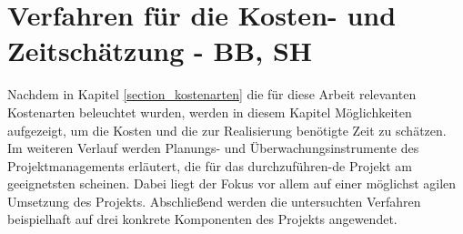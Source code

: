
\section{Verfahren für die Kosten- und Zeitschätzung - BB, SH}

\label{section_verfahren_schaetzung} %
Nachdem in Kapitel \ref{section_kostenarten} die für diese Arbeit relevanten Kostenarten 
beleuchtet wurden, werden in diesem Kapitel Möglichkeiten aufgezeigt, um die Kosten 
und die zur Realisierung benötigte Zeit zu schätzen. Im weiteren Verlauf werden 
Planungs- und Überwachungsinstrumente des Projektmanagements erläutert, die für 
das durchzuführen-de Projekt am geeignetsten scheinen. Dabei liegt der Fokus vor 
allem auf einer möglichst agilen Umsetzung des Projekts. Abschließend werden 
die untersuchten Verfahren beispielhaft auf drei konkrete Komponenten des Projekts 
angewendet.





